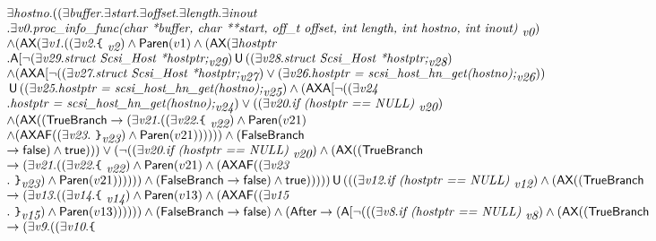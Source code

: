 \documentclass{article}
\newcommand{\U}{\,\mbox{\sf{U}}\,}
\newcommand{\A}{\mbox{\sf{A}}}
\newcommand{\AX}{\mbox{\sf{AX}}}
\newcommand{\AF}{\mbox{\sf{AF}}}
\newcommand{\mita}[1]{\mbox{\it{{#1}}}}
\newcommand{\msf}[1]{\mbox{\sf{{#1}}}}
\newcommand{\ttlb}{\mbox{\tt \char'173}}
\newcommand{\ttrb}{\mbox{\tt \char'175}}
\begin{document}
\[\begin{array}{l}
\exists \mita{hostno} . ((\exists \mita{buffer} . \exists \mita{start} . \exists \mita{offset} . \exists \mita{length} . \exists \mita{inout}\\ . \exists \mita{v0} . \mita{proc\_info\_func(char *buffer, char **start, off\_t offset, int length,
               int hostno, int inout) }_{\mita{v0}})\\ \wedge (\AX(\exists \mita{v1} . ((\exists \mita{v2} . \mita{{\ttlb}
  }_{\mita{v2}}) \wedge \msf{Paren}(v1) \wedge (\AX(\exists \mita{hostptr}\\ . \A[\neg (\exists \mita{v29} . \mita{struct Scsi\_Host *hostptr;}_{\mita{v29}}) \U ((\exists \mita{v28} . \mita{struct Scsi\_Host *hostptr;}_{\mita{v28}})\\ \wedge (\AX\A[\neg ((\exists \mita{v27} . \mita{struct Scsi\_Host *hostptr;}_{\mita{v27}}) \vee (\exists \mita{v26} . \mita{hostptr = scsi\_host\_hn\_get(hostno);}_{\mita{v26}}))\\ \U ((\exists \mita{v25} . \mita{hostptr = scsi\_host\_hn\_get(hostno);}_{\mita{v25}}) \wedge (\AX\A[\neg ((\exists \mita{v24}\\ . \mita{hostptr = scsi\_host\_hn\_get(hostno);}_{\mita{v24}}) \vee ((\exists \mita{v20} . \mita{if (hostptr == NULL) }_{\mita{v20}})\\ \wedge (\AX((\msf{TrueBranch} \rightarrow (\exists \mita{v21} . ((\exists \mita{v22} . \mita{{\ttlb}
  }_{\mita{v22}}) \wedge \msf{Paren}(v21)\\ \wedge (\AX\AF((\exists \mita{v23} . \mita{
{\ttrb}}_{\mita{v23}}) \wedge \msf{Paren}(v21)))))) \wedge (\msf{FalseBranch}\\ \rightarrow \msf{false}) \wedge \msf{true}))) \vee (\neg ((\exists \mita{v20} . \mita{if (hostptr == NULL) }_{\mita{v20}}) \wedge (\AX((\msf{TrueBranch}\\ \rightarrow (\exists \mita{v21} . ((\exists \mita{v22} . \mita{{\ttlb}
  }_{\mita{v22}}) \wedge \msf{Paren}(v21) \wedge (\AX\AF((\exists \mita{v23}\\ . \mita{
{\ttrb}}_{\mita{v23}}) \wedge \msf{Paren}(v21)))))) \wedge (\msf{FalseBranch} \rightarrow \msf{false}) \wedge \msf{true}))))) \U (((\exists \mita{v12} . \mita{if (hostptr == NULL) }_{\mita{v12}}) \wedge (\AX((\msf{TrueBranch}\\ \rightarrow (\exists \mita{v13} . ((\exists \mita{v14} . \mita{{\ttlb}
  }_{\mita{v14}}) \wedge \msf{Paren}(v13) \wedge (\AX\AF((\exists \mita{v15}\\ . \mita{
{\ttrb}}_{\mita{v15}}) \wedge \msf{Paren}(v13)))))) \wedge (\msf{FalseBranch} \rightarrow \msf{false}) \wedge (\msf{After} \rightarrow (\A[\neg (((\exists \mita{v8} . \mita{if (hostptr == NULL) }_{\mita{v8}}) \wedge (\AX((\msf{TrueBranch}\\ \rightarrow (\exists \mita{v9} . ((\exists \mita{v10} . \mita{{\ttlb}
}
\end{array}\]
\end{document}
